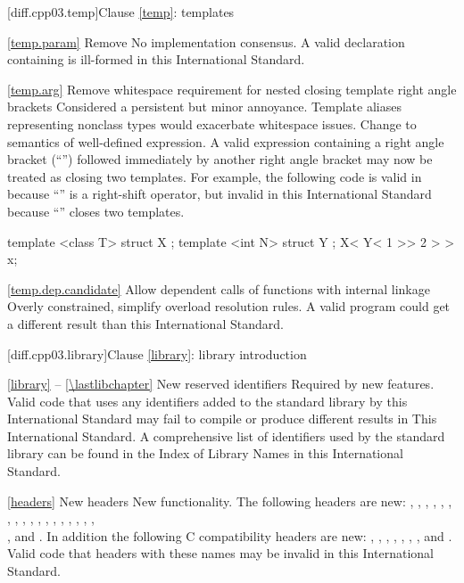 [diff.cpp03.temp]{Clause \ref{temp}: templates}

\ref{temp.param}
\change Remove 
\rationale No implementation consensus.
\effect
A valid \CppIII declaration containing  is ill-formed in this
International Standard.

\ref{temp.arg}
\change Remove whitespace requirement for nested closing template right angle
brackets
\rationale Considered a persistent but minor annoyance. Template aliases
representing nonclass types would exacerbate whitespace issues.
\effect
Change to semantics of well-defined expression. A valid \CppIII expression
containing a right angle bracket (``\tcode{>}'') followed immediately by
another right angle bracket may now be treated as closing two templates.
For example, the following code is valid in \CppIII because ``\tcode{\shr}''
is a right-shift operator, but invalid in this International Standard because
``\tcode{\shr}'' closes two templates.

\begin{codeblock}
template <class T> struct X { };
template <int N> struct Y { };
X< Y< 1 >> 2 > > x;
\end{codeblock}

\ref{temp.dep.candidate}
\change Allow dependent calls of functions with internal linkage
\rationale Overly constrained, simplify overload resolution rules.
\effect
A valid \CppIII program could get a different result than this
International Standard.

[diff.cpp03.library]{Clause \ref{library}: library introduction}

\ref{library} -- \ref{\lastlibchapter}
\change New reserved identifiers
\rationale Required by new features.
\effect
Valid \CppIII code that uses any identifiers added to the \Cpp standard
library by this International Standard may fail to compile or produce different
results in This International Standard. A comprehensive list of identifiers used
by the \Cpp standard library can be found in the Index of Library Names in this
International Standard.

\ref{headers}
\change New headers
\rationale New functionality.
\effect
The following \Cpp headers are new:
,
,
,
,
,
,
,
,
,
,
,
,
,
,
,
,
,
,\\
,
and
.
In addition the following C compatibility headers are new:
,
,
,
,
,
,
,
and
.
Valid \CppIII code that  headers with these names may be
invalid in this International Standard.

